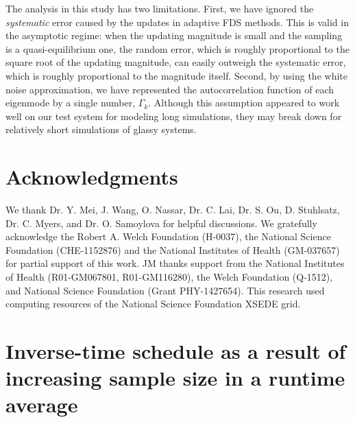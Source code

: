 \documentclass[reprint, superscriptaddress, floatfix]{revtex4-1}
\begin{document}
The analysis in this study has two limitations.
%
First, we have ignored the \emph{systematic}
error\cite{zhou2005, morozov2007, zhou2008}
caused by the updates in adaptive FDS methods.
%
This is valid in the asymptotic regime:
when the updating magnitude is small
and the sampling is a quasi-equilibrium one\cite{
  zhou2005, morozov2007, zhou2008, barducci2008, dama2014},
the random error,
which is roughly proportional to
the square root of the updating magnitude\cite{
  zhou2005, morozov2007, zhou2008, bussi2006},
can easily outweigh
the systematic error,
which is roughly proportional to
the magnitude itself\cite{morozov2007}.
%
%
Second, by using the white noise approximation,
we have represented the autocorrelation function
of each eigenmode by a single number, $\Gamma_k$.
%
Although this assumption appeared to work well
on our test system for modeling long simulations,
they may break down for relatively short simulations
of glassy systems.


\section{Acknowledgments}

We thank Dr. Y. Mei, J. Wang,
O. Nassar, Dr. C. Lai, Dr. S. Ou, D. Stuhlsatz,
Dr. C. Myers, and Dr. O. Samoylova
for helpful discussions.
%
We gratefully acknowledge the Robert A. Welch Foundation (H-0037),
the National Science Foundation (CHE-1152876)
and the National Institutes of Health (GM-037657)
for partial support of this work.
%
JM thanks support from the National Institutes of Health (R01-GM067801, R01-GM116280),
the Welch Foundation (Q-1512),
and National Science Foundation (Grant PHY-1427654).
%
This research used computing resources of the National Science Foundation XSEDE grid.
%
%


\appendix




\section{\label{sec:equilerr}
Inverse-time schedule as a result of increasing sample size
in a runtime average
}
\end{document}
